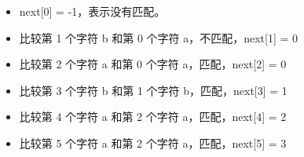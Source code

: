 \documentclass[12pt,hyperref,a4paper,UTF8]{ctexart}
\begin{document}
\begin{itemize}
    \item next[0] = -1，表示没有匹配。
    \item 比较第 1 个字符 b 和第 0 个字符 a，不匹配，next[1] = 0
    \item 比较第 2 个字符 a 和第 0 个字符 a，匹配，next[2] = 0
    \item 比较第 3 个字符 b 和第 1 个字符 b，匹配，next[3] = 1
    \item 比较第 4 个字符 a 和第 2 个字符 a，匹配，next[4] = 2
    \item 比较第 5 个字符 a 和第 2 个字符 a，匹配，next[5] = 3
\end{itemize}
\end{document}
